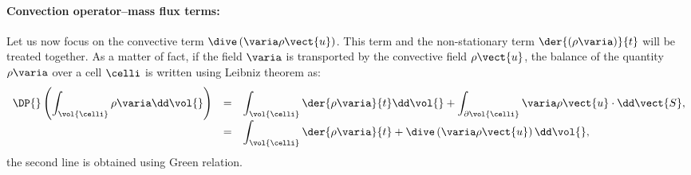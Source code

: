 \paragraph{Convection operator--mass flux terms:}
 Let us now focus on the convective term $\dive \left( \varia \rho \vect{u}\right)$. This term and the
 non-stationary term $ \der{ \left( \rho \varia \right) }{ t} $ will be treated
 together. As a matter of fact, if the field $\varia$ is transported by the convective field $\rho \vect{u}$, the balance
 of the quantity $\rho \varia$ over a cell $\celli$ is written using Leibniz theorem as:
 \begin{equation}\label{eq:spadis:leibnitz_th}
\begin{array}{r c l}
\displaystyle \DP{} \left( \int_{\vol{\celli}} \rho \varia \dd \vol{}\right) &=& 
\displaystyle \int_{\vol{\celli}} \der{\rho \varia}{t} \dd \vol{} + \int_{\partial \vol{\celli}} \varia \rho \vect{u} \cdot  \dd \vect{S}, \\
\displaystyle &=&
\displaystyle \int_{\vol{\celli}} \der{\rho \varia}{t} + \dive \left( \varia \rho \vect{u} \right)  \dd \vol{},
\end{array}
 \end{equation}
the second line is obtained using Green relation. 
 
